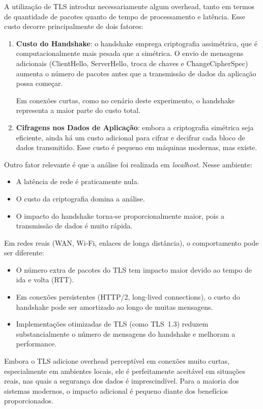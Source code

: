 \documentclass[]{article}
\begin{document}
A utilização de TLS introduz necessariamente algum overhead, tanto em termos de quantidade de pacotes quanto de tempo de processamento e latência. Esse custo decorre principalmente de dois fatores:

\begin{enumerate}
    \item \textbf{Custo do Handshake}: o handshake emprega criptografia assimétrica, que é computacionalmente mais pesada que a simétrica. O envio de mensagens adicionais (ClientHello, ServerHello, troca de chaves e ChangeCipherSpec) aumenta o número de pacotes antes que a transmissão de dados da aplicação possa começar.
    
    Em conexões curtas, como no cenário deste experimento, o handshake representa a maior parte do custo total.

    \item \textbf{Cifragens nos Dados de Aplicação}: embora a criptografia simétrica seja eficiente, ainda há um custo adicional para cifrar e decifrar cada bloco de dados transmitido. Esse custo é pequeno em máquinas modernas, mas existe.
\end{enumerate}

Outro fator relevante é que a análise foi realizada em \textit{localhost}. Nesse ambiente:

\begin{itemize}
    \item A latência de rede é praticamente nula.
    \item O custo da criptografia domina a análise.
    \item O impacto do handshake torna-se proporcionalmente maior, pois a transmissão de dados é muito rápida.
\end{itemize}

Em redes reais (WAN, Wi-Fi, enlaces de longa distância), o comportamento pode ser diferente:

\begin{itemize}
    \item O número extra de pacotes do TLS tem impacto maior devido ao tempo de ida e volta (RTT).
    \item Em conexões persistentes (HTTP/2, long-lived connections), o custo do handshake pode ser amortizado ao longo de muitas mensagens.
    \item Implementações otimizadas de TLS (como TLS~1.3) reduzem substancialmente o número de mensagens do handshake e melhoram a performance.
\end{itemize}

Embora o TLS adicione overhead perceptível em conexões muito curtas, especialmente em ambientes locais, ele é perfeitamente aceitável em situações reais, nas quais a segurança dos dados é imprescindível. Para a maioria dos sistemas modernos, o impacto adicional é pequeno diante dos benefícios proporcionados.
\end{document}
